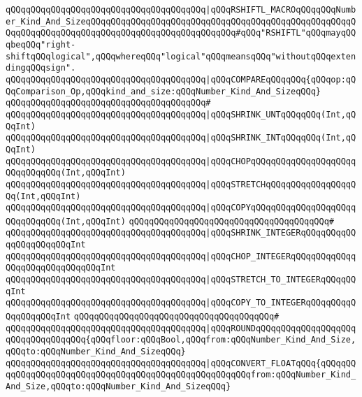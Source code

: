 \verb|qQQqqQQqqQQqqQQqqQQqqQQqqQQqqQQqqQQqqQQq|\verb#|qQQqRSHIFTL_MACROqQQqqQQqNumber_Kind_And_SizeqQQqqQQqqQQqqQQqqQQqqQQqqQQqqQQqqQQqqQQqqQQqqQQqqQQqqQQqqQQqqQQqqQQqqQQqqQQqqQQqqQQqqQQqqQQqqQQqqQQq#\verb|#qQQq"RSHIFTL"qQQqmayqQQqbeqQQq"right-shiftqQQqlogical",qQQqwhereqQQq"logical"qQQqmeansqQQq"withoutqQQqextendingqQQqsign".|\newline
\verb|qQQqqQQqqQQqqQQqqQQqqQQqqQQqqQQqqQQqqQQq|\verb#|qQQqCOMPAREqQQqqQQq{qQQqop:qQQqComparison_Op,qQQqkind_and_size:qQQqNumber_Kind_And_SizeqQQq}#\newline
\verb|qQQqqQQqqQQqqQQqqQQqqQQqqQQqqQQqqQQqqQQq#|\newline
\verb|qQQqqQQqqQQqqQQqqQQqqQQqqQQqqQQqqQQqqQQq|\verb#|qQQqSHRINK_UNTqQQqqQQq(Int,qQQqInt)#\newline
\verb|qQQqqQQqqQQqqQQqqQQqqQQqqQQqqQQqqQQqqQQq|\verb#|qQQqSHRINK_INTqQQqqQQq(Int,qQQqInt)#\newline
\verb|qQQqqQQqqQQqqQQqqQQqqQQqqQQqqQQqqQQqqQQq|\verb#|qQQqCHOPqQQqqQQqqQQqqQQqqQQqqQQqqQQqqQQq(Int,qQQqInt)#\newline
\verb|qQQqqQQqqQQqqQQqqQQqqQQqqQQqqQQqqQQqqQQq|\verb#|qQQqSTRETCHqQQqqQQqqQQqqQQqqQQq(Int,qQQqInt)#\newline
\verb|qQQqqQQqqQQqqQQqqQQqqQQqqQQqqQQqqQQqqQQq|\verb#|qQQqCOPYqQQqqQQqqQQqqQQqqQQqqQQqqQQqqQQq(Int,qQQqInt)#\newline
\verb|qQQqqQQqqQQqqQQqqQQqqQQqqQQqqQQqqQQqqQQq#|\newline
\verb|qQQqqQQqqQQqqQQqqQQqqQQqqQQqqQQqqQQqqQQq|\verb#|qQQqSHRINK_INTEGERqQQqqQQqqQQqqQQqqQQqqQQqInt#\newline
\verb|qQQqqQQqqQQqqQQqqQQqqQQqqQQqqQQqqQQqqQQq|\verb#|qQQqCHOP_INTEGERqQQqqQQqqQQqqQQqqQQqqQQqqQQqqQQqInt#\newline
\verb|qQQqqQQqqQQqqQQqqQQqqQQqqQQqqQQqqQQqqQQq|\verb#|qQQqSTRETCH_TO_INTEGERqQQqqQQqInt#\newline
\verb|qQQqqQQqqQQqqQQqqQQqqQQqqQQqqQQqqQQqqQQq|\verb#|qQQqCOPY_TO_INTEGERqQQqqQQqqQQqqQQqqQQqInt#\newline
\verb|qQQqqQQqqQQqqQQqqQQqqQQqqQQqqQQqqQQqqQQq#|\newline
\verb|qQQqqQQqqQQqqQQqqQQqqQQqqQQqqQQqqQQqqQQq|\verb#|qQQqROUNDqQQqqQQqqQQqqQQqqQQqqQQqqQQqqQQqqQQq{qQQqfloor:qQQqBool,qQQqfrom:qQQqNumber_Kind_And_Size,qQQqto:qQQqNumber_Kind_And_SizeqQQq}#\newline
\verb|qQQqqQQqqQQqqQQqqQQqqQQqqQQqqQQqqQQqqQQq|\verb#|qQQqCONVERT_FLOATqQQq{qQQqqQQqqQQqqQQqqQQqqQQqqQQqqQQqqQQqqQQqqQQqqQQqqQQqqQQqfrom:qQQqNumber_Kind_And_Size,qQQqto:qQQqNumber_Kind_And_SizeqQQq}#\newline
